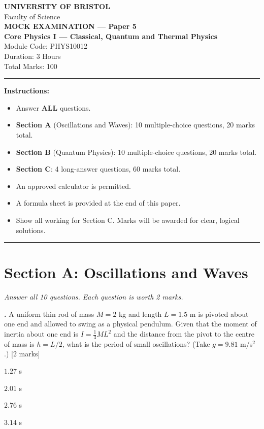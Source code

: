 \documentclass[12pt,a4paper]{article}
\newcounter{mcqcounter}
\newcommand{\mcq}[1]{%
  \stepcounter{mcqcounter}%
  \vspace{0.3cm}%
  \noindent\textbf{\themcqcounter.} #1 \hfill [2 marks]%
  \vspace{0.1cm}%
}
\begin{document}
\begin{center}
{\Large\textbf{UNIVERSITY OF BRISTOL}}\\[0.3cm]
{\large Faculty of Science}\\[0.5cm]
{\Large\textbf{MOCK EXAMINATION --- Paper 5}}\\[0.3cm]
{\large\textbf{Core Physics I --- Classical, Quantum and Thermal Physics}}\\[0.2cm]
{\large Module Code: PHYS10012}\\[0.5cm]
{\large Duration: 3 Hours}\\[0.3cm]
{\large Total Marks: 100}\\[0.5cm]
\end{center}

\noindent\rule{\textwidth}{0.4pt}

\vspace{0.3cm}
\noindent\textbf{Instructions:}
\begin{itemize}[itemsep=0.1cm]
\item Answer \textbf{ALL} questions.
\item \textbf{Section A} (Oscillations and Waves): 10 multiple-choice questions, 20 marks total.
\item \textbf{Section B} (Quantum Physics): 10 multiple-choice questions, 20 marks total.
\item \textbf{Section C}: 4 long-answer questions, 60 marks total.
\item An approved calculator is permitted.
\item A formula sheet is provided at the end of this paper.
\item Show all working for Section C. Marks will be awarded for clear, logical solutions.
\end{itemize}

\noindent\rule{\textwidth}{0.4pt}
\newpage

\section*{Section A: Oscillations and Waves}
\noindent\textit{Answer all 10 questions. Each question is worth 2 marks.}\\[0.3cm]

\setcounter{mcqcounter}{0}

\mcq{A uniform thin rod of mass $M = 2$ kg and length $L = 1.5$ m is pivoted about one end and allowed to swing as a physical pendulum. Given that the moment of inertia about one end is $I = \frac{1}{3}ML^2$ and the distance from the pivot to the centre of mass is $h = L/2$, what is the period of small oscillations? (Take $g = 9.81$ m/s$^2$.)}
\begin{choices}
\item $1.27$ s
\item $2.01$ s
\item $2.76$ s
\item $3.14$ s
\end{choices}
\end{document}
